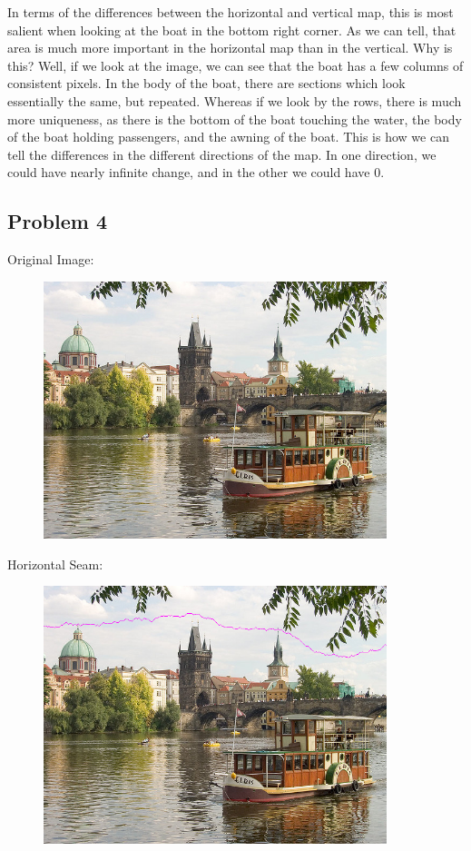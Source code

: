 \documentclass[12pt]{article}
\begin{document}
\noindent
In terms of the differences between the horizontal and vertical map, this is most salient when looking at the boat in the bottom right corner. As we can tell, that area is much more important in the horizontal map than in the vertical. Why is this? Well, if we look at the image, we can see that the boat has a few columns of consistent pixels. In the body of the boat, there are sections which look essentially the same, but repeated. Whereas if we look by the rows, there is much more uniqueness, as there is the bottom of the boat touching the water, the body of the boat holding passengers, and the awning of the boat. This is how we can tell the differences in the different directions of the map. In one direction, we could have nearly infinite change, and in the other we could have 0.


\newpage
\subsection*{Problem 4}
Original Image:
\begin{figure}[H]
  \includegraphics[width=100mm]{inputSeamCarvingPrague.jpg}
\end{figure}

\noindent
Horizontal Seam:
\begin{figure}[H]
  \includegraphics[width=100mm]{PS1_Q4_2.png}
\end{figure}
\end{document}
